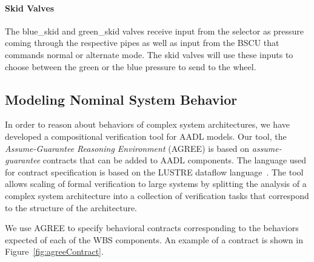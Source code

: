 \paragraph{Skid Valves}
The blue\_skid and green\_skid valves receive input from the selector as pressure coming through the respective pipes as well as input from the BSCU that commands normal or alternate mode. The skid valves will use these inputs to choose between the green or the blue pressure to send to the wheel.

\subsection{Modeling Nominal System Behavior}
In order to reason about behaviors of complex system architectures, we have developed a compositional verification tool for AADL models.
Our tool, the {\em Assume-Guarantee Reasoning Environment} (AGREE) \cite{NFM2012:CoGaMiWhLaLu}  is based on {\em assume-guarantee} contracts that can be added to AADL components.  The language used for contract specification is based on the LUSTRE dataflow language~\cite{Halbwachs91:IEEE}. The tool allows scaling of formal verification to large systems by splitting the analysis of a complex system architecture into a collection of verification tasks that correspond to the structure of the architecture.

We use AGREE to specify behavioral contracts corresponding to the behaviors expected of each of the WBS components. An example of a contract is shown in Figure~\ref{fig:agreeContract}.
%

